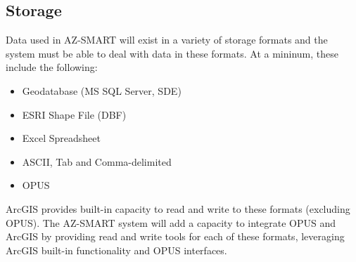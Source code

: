 \subsection{Storage}
Data used in AZ-SMART will exist in a variety of storage formats and the system must be able to deal with data in these formats.  At a mininum, these include the following:

\begin{itemize}
\item Geodatabase (MS SQL Server, SDE)
\item ESRI Shape File (DBF)
\item Excel Spreadsheet
\item ASCII, Tab and Comma-delimited
\item OPUS
\end{itemize}

ArcGIS provides built-in capacity to read and write to these formats (excluding OPUS).  The AZ-SMART system will add a capacity to integrate OPUS and ArcGIS by providing read and write tools for each of these formats, leveraging ArcGIS built-in functionality and OPUS interfaces.